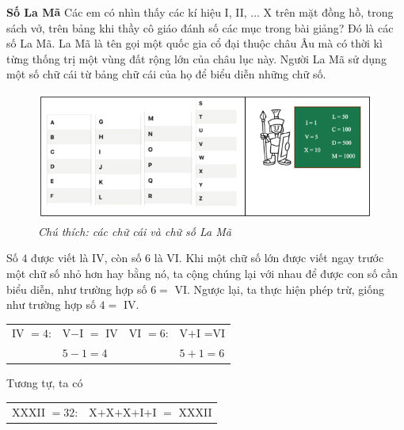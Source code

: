 \begin{multicols}{2}
\begin{center}
	\end{center}
	\vskip 0.1cm
	\textbf{Số La Mã}
	\vskip 0.1cm
	Các em có nhìn thấy các kí hiệu I, II, ... X trên mặt đồng hồ, trong sách vở, trên bảng khi thầy cô giáo đánh số các mục trong bài giảng? Đó là các số La Mã. La Mã là tên gọi một quốc gia cổ đại thuộc châu Âu mà có thời kì từng thống trị một vùng đất rộng lớn của châu lục này. Người La Mã sử dụng một số chữ cái từ bảng chữ cái của họ để biểu diễn những chữ số.
	\begin{figure}[H]
		\centering
		\vspace*{-10pt}
		\captionsetup{labelformat= empty, justification=centering}
		\includegraphics[width=1\linewidth]{111}
		\caption{\small\textit{Chú thích: các chữ cái và chữ số La Mã}}
		\vspace*{-10pt}
	\end{figure}
	Số $4$ được viết là IV, còn số $6$ là VI. Khi một chữ số lớn được viết ngay trước  một chữ số nhỏ hơn hay bằng nó, ta cộng chúng lại với nhau để được con số cần biểu diễn, như trường hợp số $6=$ VI. Ngược lại, ta thực hiện phép trừ, giống như trường hợp số $4=$ IV.
	\begin{table}[H]
		\centering
		\setlength{\tabcolsep}{4.5pt}
		\renewcommand{\arraystretch}{1.25}
		\begin{tabular}{|l l|l l|}
			\hline
			IV $=4$:&    V$-$I $=$ IV & VI $=6$:&    V$+$I =VI\\
			&$5-1=4$ & &$5+1=6$\\
			\hline
		\end{tabular}
		\vspace*{-10pt}
	\end{table}
	Tương tự, ta có
	\begin{table}[H]
		\vspace*{-5pt}
		\centering
		\setlength{\tabcolsep}{3.7pt}
		\renewcommand{\arraystretch}{1.25}
		\begin{tabular}{|l l|}
				\hline
				XXXII $\!=\! 32$:&    X$+$X$+$X$+$I$+$I $\!=\!$ XXXII\\

\end{tabular}
\end{table}
\end{multicols}
